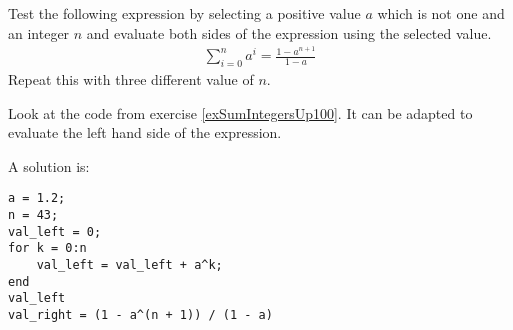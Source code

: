 \begin{ex}
Test the following expression by selecting a positive value $a$
which is not one and an integer $n$
and evaluate both sides of the expression using the selected value.
\begin{align*}
\sum_{i = 0}^n a^i = \frac{1 - a^{n + 1}}{1 - a}
\end{align*}
Repeat this with three different value of $n$.
\begin{hint}
Look at the code from exercise \ref{exSumIntegersUp100}.
It can be adapted to evaluate the left hand side of the expression.
\end{hint}
\begin{sol}
A solution is:
\begin{lstlisting}
a = 1.2;
n = 43;
val_left = 0;
for k = 0:n
    val_left = val_left + a^k;
end
val_left
val_right = (1 - a^(n + 1)) / (1 - a)
\end{lstlisting}
\end{sol}
\end{ex}
